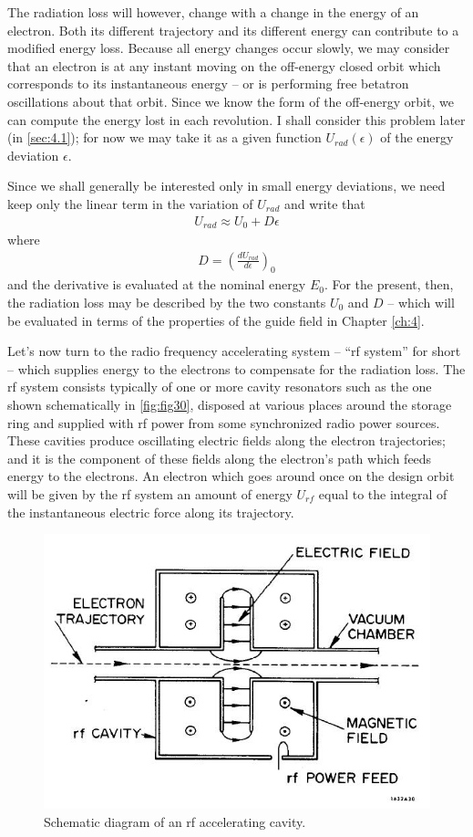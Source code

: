 The radiation loss will however, change with a change in the energy of an electron. Both its different trajectory and its different energy can contribute to a modified energy loss. Because all energy changes occur slowly, we may consider that an electron is at any instant moving on the off-energy
 closed orbit which corresponds to its instantaneous energy -- or is performing free betatron oscillations about that orbit. Since we know the form of the off-energy orbit, we can compute the energy lost in each revolution. I shall consider this problem later (in \autoref{sec:4.1}); for now we may take it as a given function $U_{rad}(\epsilon)$ of the energy deviation $\epsilon$.

Since we shall generally be interested only in small energy deviations, we need keep only the linear term in the variation of $U_{rad}$ and write that
\begin{align}
	U_{rad} \approx U_0 + D\epsilon\label{eq:3.23}
\end{align}
where
\begin{align} \label{eq:3.24}
	D = \left(\frac{dU_{rad}}{d\epsilon}\right)_0
\end{align}
and the derivative is evaluated at the nominal energy $E_0$. For the present, then, the radiation loss may be described by the two constants $U_0$ and $D$ -- which will be evaluated in terms of the properties of the guide field in Chapter \ref{ch:4}.

Let's now turn to the radio frequency accelerating system -- “rf system” for short -- which supplies energy to the electrons to compensate for the radiation loss. The rf system consists typically of one or more cavity resonators such as the one shown schematically in \autoref{fig:fig30}, disposed at various places around the storage ring
and supplied with rf power from some synchronized radio power sources. These cavities produce oscillating electric fields along the electron trajectories; and it is the component of these fields along the electron's path which feeds energy to the electrons. An electron which goes around once on the design orbit will be given by the rf system an amount of energy $U_{rf}$ equal to the integral of the instantaneous electric force along its trajectory.

 \begin{figure}[!htb]
 	\centering
 	\includegraphics[width=0.7\linewidth]{./Figuras/fig30.jpeg}
 	\caption{Schematic diagram of an rf accelerating cavity.}
 	\label{fig:fig30}
 \end{figure}

